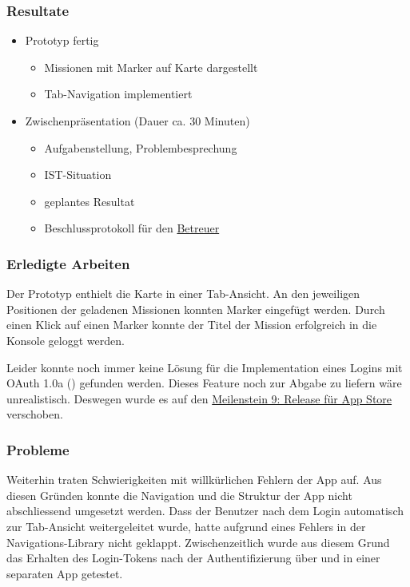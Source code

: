 \subsubsection{Resultate}
\begin{itemize}
	\item {} Prototyp fertig
	\begin{itemize}
		\item Missionen mit Marker auf Karte dargestellt
		\item Tab-Navigation implementiert
	\end{itemize}
	\item Zwischenpräsentation (Dauer ca. 30 Minuten)
	\begin{itemize}
		\item Aufgabenstellung, Problembesprechung
		\item IST-Situation
		\item geplantes Resultat
		\item Beschlussprotokoll für den \hyperref[pm-team]{Betreuer}
	\end{itemize}
\end{itemize}

\subsubsection{Erledigte Arbeiten}
Der Prototyp enthielt die Karte in einer Tab-Ansicht. 
An den jeweiligen Positionen der geladenen Missionen konnten Marker eingefügt werden.
Durch einen Klick auf einen Marker konnte der Titel der Mission erfolgreich in die Konsole geloggt werden.

Leider konnte noch immer keine Lösung für die Implementation eines Logins mit \gls{OAuth} 1.0a () gefunden werden.
Dieses Feature noch zur Abgabe zu liefern wäre unrealistisch.
Deswegen wurde es auf den \hyperref[pm-ms9]{Meilenstein 9: Release für App Store} verschoben.

\subsubsection{Probleme}
Weiterhin traten Schwierigkeiten mit willkürlichen Fehlern der  App auf. 
Aus diesen Gründen konnte die Navigation und die Struktur der App nicht abschliessend umgesetzt werden.
Dass der Benutzer nach dem Login automatisch zur Tab-Ansicht weitergeleitet wurde, hatte aufgrund eines Fehlers in der Navigations-\gls{Library} nicht geklappt.
Zwischenzeitlich wurde aus diesem Grund das Erhalten des Login-Tokens nach der Authentifizierung über  und  in einer separaten App getestet.


